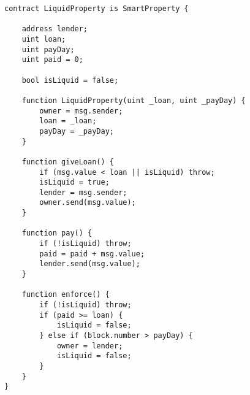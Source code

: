 \begin{lstlisting}[breaklines,basicstyle=\tiny]
contract LiquidProperty is SmartProperty {
    
    address lender;
    uint loan;
    uint payDay;
    uint paid = 0;
    
    bool isLiquid = false;
    
    function LiquidProperty(uint _loan, uint _payDay) {
        owner = msg.sender;
        loan = _loan;
        payDay = _payDay;
    }
    
    function giveLoan() {
        if (msg.value < loan || isLiquid) throw;
        isLiquid = true;
        lender = msg.sender;
        owner.send(msg.value);
    }
    
    function pay() {
        if (!isLiquid) throw;
        paid = paid + msg.value;
        lender.send(msg.value);
    }
    
    function enforce() {
        if (!isLiquid) throw;
        if (paid >= loan) {
            isLiquid = false;
        } else if (block.number > payDay) {
            owner = lender;
            isLiquid = false;
        }
    }
}
\end{lstlisting}